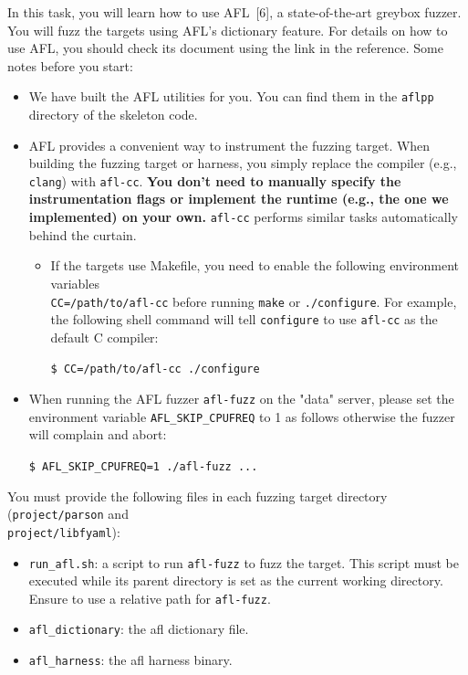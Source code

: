 \documentclass[letterpaper,11pt]{article}
\begin{document}
In this task, you will learn how to use AFL~[6], a state-of-the-art greybox fuzzer.
You will fuzz the targets using AFL's dictionary feature.
For details on how to use AFL, you should check its document using the link in the reference. Some notes before you start:

\begin{itemize}
    \item We have built the AFL utilities for you. You can find them in the \texttt{aflpp} directory of the skeleton code.

    \item AFL provides a convenient way to instrument the fuzzing target. When building the fuzzing target or harness, you simply replace the compiler (e.g., \texttt{clang}) with \texttt{afl-cc}. \textbf{You don't need to manually specify the instrumentation flags or implement the runtime (e.g., the one we implemented) on your own.} \texttt{afl-cc} performs similar tasks automatically behind the curtain.
    \begin{itemize}
        \item  If the targets use Makefile, you need to enable the following environment variables \\ \texttt{CC=/path/to/afl-cc} before running \texttt{make} or \texttt{./configure}. For example, the following shell command will tell \texttt{configure} to use \texttt{afl-cc} as the default C compiler:

        \texttt{\$ CC=/path/to/afl-cc ./configure}
    \end{itemize}

    \item When running the AFL fuzzer \texttt{afl-fuzz} on the "data" server, please set the environment variable \texttt{AFL_SKIP_CPUFREQ} to 1 as follows otherwise the fuzzer will complain and abort:

    \texttt{\$ AFL_SKIP_CPUFREQ=1 ./afl-fuzz ...}


\end{itemize}


You must provide the following files in each fuzzing target directory (\texttt{project/parson} and \\ \texttt{project/libfyaml}):
    \begin{itemize}
        \item \texttt{run_afl.sh}: a script to run \texttt{afl-fuzz} to fuzz the target. This script must be executed while its parent directory is set as the current working directory. Ensure to use a relative path for \texttt{afl-fuzz}.
        \item \texttt{afl_dictionary}: the afl dictionary file.
        \item \texttt{afl_harness}: the afl harness binary.

    \end{itemize}
\end{document}
